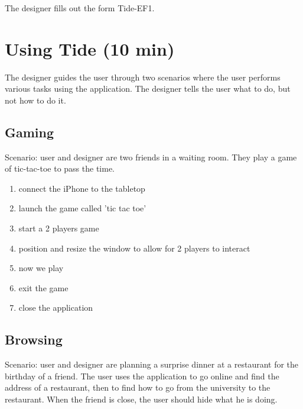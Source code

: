\documentclass[11pt]{amsart}
\begin{document}
The designer fills out the form Tide-EF1.

\section{Using Tide (10 min)}

The designer guides the user through two scenarios where the user performs various tasks using the application.
The designer tells the user what to do, but not how to do it.

\subsection{Gaming}

Scenario: user and designer are two friends in a waiting room. They play a game of tic-tac-toe to pass the time.

\begin{enumerate}
\item connect the iPhone to the tabletop
\item launch the game called 'tic tac toe'
\item start a 2 players game
\item position and resize the window to allow for 2 players to interact
\item now we play
\item exit the game
\item close the application
\end{enumerate}

\subsection{Browsing}

Scenario: user and designer are planning a surprise dinner at a restaurant for the birthday of a friend. The user uses the application to go online and find the address of a restaurant, then to find how to go from the university to the restaurant.
When the friend is close, the user should hide what he is doing.
\end{document}
